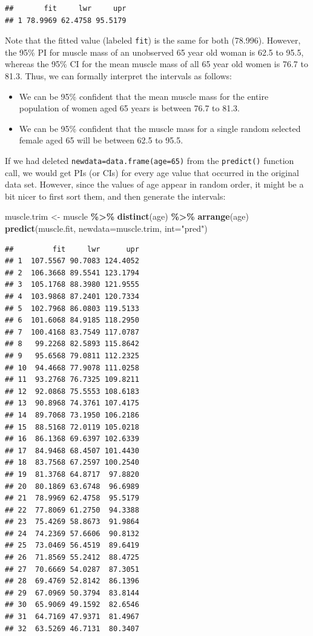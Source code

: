\documentclass[
]{book}
\newenvironment{Shaded}{\begin{snugshade}}{\end{snugshade}}
\newcommand{\AttributeTok}[1]{\textcolor[rgb]{0.13,0.29,0.53}{#1}}
\newcommand{\FunctionTok}[1]{\textcolor[rgb]{0.13,0.29,0.53}{\textbf{#1}}}
\newcommand{\NormalTok}[1]{#1}
\newcommand{\OtherTok}[1]{\textcolor[rgb]{0.56,0.35,0.01}{#1}}
\newcommand{\SpecialCharTok}[1]{\textcolor[rgb]{0.81,0.36,0.00}{\textbf{#1}}}
\newcommand{\StringTok}[1]{\textcolor[rgb]{0.31,0.60,0.02}{#1}}
\providecommand{\tightlist}{%
  \setlength{\itemsep}{0pt}\setlength{\parskip}{0pt}}
\begin{document}
\begin{verbatim}
##       fit     lwr     upr
## 1 78.9969 62.4758 95.5179
\end{verbatim}

Note that the fitted value (labeled \texttt{fit}) is the same for both (78.996).
However, the 95\% PI for muscle mass of an unobserved 65 year old woman is 62.5 to 95.5, whereas the 95\% CI for the mean muscle mass of all 65 year old women is 76.7 to 81.3.
Thus, we can formally interpret the intervals as follows:

\begin{itemize}
\tightlist
\item
  We can be 95\% confident that the mean muscle mass for the entire population of women aged 65 years is between 76.7 to 81.3.
\item
  We can be 95\% confident that the muscle mass for a single random selected female aged 65 will be between 62.5 to 95.5.
\end{itemize}

If we had deleted \texttt{newdata=data.frame(age=65)} from the \texttt{predict()} function call, we would get PIs (or CIs) for every age value that occurred in the original data set.
However, since the values of age appear in random order, it might be a bit nicer to first sort them, and then generate the intervals:

\begin{Shaded}
\begin{Highlighting}[]
\NormalTok{muscle.trim }\OtherTok{\textless{}{-}}\NormalTok{ muscle }\SpecialCharTok{\%\textgreater{}\%}
  \FunctionTok{distinct}\NormalTok{(age) }\SpecialCharTok{\%\textgreater{}\%}
  \FunctionTok{arrange}\NormalTok{(age)}
\FunctionTok{predict}\NormalTok{(muscle.fit, }\AttributeTok{newdata=}\NormalTok{muscle.trim, }\AttributeTok{int=}\StringTok{"pred"}\NormalTok{)}
\end{Highlighting}
\end{Shaded}

\begin{verbatim}
##         fit     lwr      upr
## 1  107.5567 90.7083 124.4052
## 2  106.3668 89.5541 123.1794
## 3  105.1768 88.3980 121.9555
## 4  103.9868 87.2401 120.7334
## 5  102.7968 86.0803 119.5133
## 6  101.6068 84.9185 118.2950
## 7  100.4168 83.7549 117.0787
## 8   99.2268 82.5893 115.8642
## 9   95.6568 79.0811 112.2325
## 10  94.4668 77.9078 111.0258
## 11  93.2768 76.7325 109.8211
## 12  92.0868 75.5553 108.6183
## 13  90.8968 74.3761 107.4175
## 14  89.7068 73.1950 106.2186
## 15  88.5168 72.0119 105.0218
## 16  86.1368 69.6397 102.6339
## 17  84.9468 68.4507 101.4430
## 18  83.7568 67.2597 100.2540
## 19  81.3768 64.8717  97.8820
## 20  80.1869 63.6748  96.6989
## 21  78.9969 62.4758  95.5179
## 22  77.8069 61.2750  94.3388
## 23  75.4269 58.8673  91.9864
## 24  74.2369 57.6606  90.8132
## 25  73.0469 56.4519  89.6419
## 26  71.8569 55.2412  88.4725
## 27  70.6669 54.0287  87.3051
## 28  69.4769 52.8142  86.1396
## 29  67.0969 50.3794  83.8144
## 30  65.9069 49.1592  82.6546
## 31  64.7169 47.9371  81.4967
## 32  63.5269 46.7131  80.3407
\end{verbatim}
\end{document}
